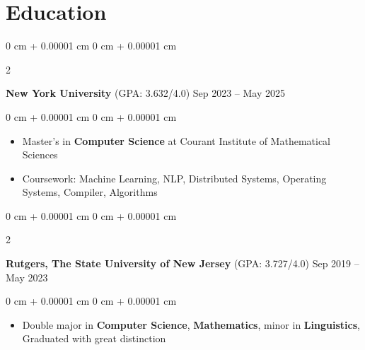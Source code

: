 \documentclass[10pt, letterpaper]{article}
\newenvironment{onecolentry}{
    \begin{adjustwidth}{
        0 cm + 0.00001 cm
    }{
        0 cm + 0.00001 cm
    }
}{
    \end{adjustwidth}
} %
\newenvironment{twocolentry}[2][]{
    \onecolentry
    \def\secondColumn{#2}
    \setcolumnwidth{\fill, 4.5 cm}
    \begin{paracol}{2}
}{
    \switchcolumn \raggedleft \secondColumn
    \end{paracol}
    \endonecolentry
} %
\begin{document}
    \vspace{5 pt - 0.3 cm}

    \section{Education}



        
        \begin{twocolentry}{
            Sep 2023 – May 2025
        }
            \textbf{New York University} (GPA: 3.632/4.0) \end{twocolentry}

        \vspace{0.10 cm}
        \begin{onecolentry}
            \begin{itemize}[
                    topsep=0.03 cm,
                    parsep=0.05 cm,
                    partopsep=0pt,
                    itemsep=0pt,
                    leftmargin=0 cm + 10pt
                ]
                \item[] Master's in \textbf{Computer Science} at Courant Institute of Mathematical Sciences
                \item[] Coursework: Machine Learning, NLP, Distributed Systems, Operating Systems, Compiler, Algorithms
            \end{itemize}
        \end{onecolentry}

        \vspace{0.10 cm}

        \begin{twocolentry}{
            Sep 2019 – May 2023
        }
            \textbf{Rutgers, The State University of New Jersey} (GPA: 3.727/4.0) \end{twocolentry}

        \vspace{0.10 cm}
        \begin{onecolentry}
            \begin{itemize}[
                    topsep=0.05 cm,
                    parsep=0.05 cm,
                    partopsep=0pt,
                    itemsep=0pt,
                    leftmargin=0 cm + 10pt
                ]
                \item[] Double major in \textbf{Computer Science}, \textbf{Mathematics}, minor in \textbf{Linguistics}, Graduated with great distinction
            \end{itemize}
        \end{onecolentry}
\end{document}
